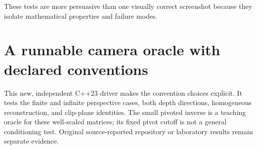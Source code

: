 These tests are more persuasive than one visually correct screenshot because they isolate mathematical properties and failure modes.

\section{A runnable camera oracle with declared conventions}\label{02-foundations-ii-ch037-a-runnable-camera-oracle-with-declared-conventions}

This new, independent C++23 driver makes the convention choices explicit. It tests the finite and infinite perspective cases, both depth directions, homogeneous reconstruction, and clip-plane identities. The small pivoted inverse is a teaching oracle for these well-scaled matrices; its fixed pivot cutoff is not a general conditioning test. Original source-reported repository or laboratory results remain separate evidence.

